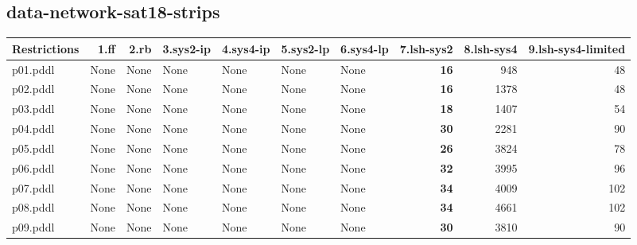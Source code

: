 \documentclass{article}
\begin{document}
\hypertarget{restrictions-data-network-sat18-strips}{}
\subsection*{data-network-sat18-strips}

\begin{tabular}{@{}lrrrrrrrrr@{}}
Restrictions & 1.ff & 2.rb & 3.sys2-ip & 4.sys4-ip & 5.sys2-lp & 6.sys4-lp & 7.lsh-sys2 & 8.lsh-sys4 & 9.lsh-sys4-limited \\
\midrule
p01.pddl & \multicolumn{1}{|l|}{None} & \multicolumn{1}{|l|}{None} & \multicolumn{1}{|l|}{None} & \multicolumn{1}{|l|}{None} & \multicolumn{1}{|l|}{None} & \multicolumn{1}{|l|}{None} & \textbf{16} & 948 & 48 \\
p02.pddl & \multicolumn{1}{|l|}{None} & \multicolumn{1}{|l|}{None} & \multicolumn{1}{|l|}{None} & \multicolumn{1}{|l|}{None} & \multicolumn{1}{|l|}{None} & \multicolumn{1}{|l|}{None} & \textbf{16} & 1378 & 48 \\
p03.pddl & \multicolumn{1}{|l|}{None} & \multicolumn{1}{|l|}{None} & \multicolumn{1}{|l|}{None} & \multicolumn{1}{|l|}{None} & \multicolumn{1}{|l|}{None} & \multicolumn{1}{|l|}{None} & \textbf{18} & 1407 & 54 \\
p04.pddl & \multicolumn{1}{|l|}{None} & \multicolumn{1}{|l|}{None} & \multicolumn{1}{|l|}{None} & \multicolumn{1}{|l|}{None} & \multicolumn{1}{|l|}{None} & \multicolumn{1}{|l|}{None} & \textbf{30} & 2281 & 90 \\
p05.pddl & \multicolumn{1}{|l|}{None} & \multicolumn{1}{|l|}{None} & \multicolumn{1}{|l|}{None} & \multicolumn{1}{|l|}{None} & \multicolumn{1}{|l|}{None} & \multicolumn{1}{|l|}{None} & \textbf{26} & 3824 & 78 \\
p06.pddl & \multicolumn{1}{|l|}{None} & \multicolumn{1}{|l|}{None} & \multicolumn{1}{|l|}{None} & \multicolumn{1}{|l|}{None} & \multicolumn{1}{|l|}{None} & \multicolumn{1}{|l|}{None} & \textbf{32} & 3995 & 96 \\
p07.pddl & \multicolumn{1}{|l|}{None} & \multicolumn{1}{|l|}{None} & \multicolumn{1}{|l|}{None} & \multicolumn{1}{|l|}{None} & \multicolumn{1}{|l|}{None} & \multicolumn{1}{|l|}{None} & \textbf{34} & 4009 & 102 \\
p08.pddl & \multicolumn{1}{|l|}{None} & \multicolumn{1}{|l|}{None} & \multicolumn{1}{|l|}{None} & \multicolumn{1}{|l|}{None} & \multicolumn{1}{|l|}{None} & \multicolumn{1}{|l|}{None} & \textbf{34} & 4661 & 102 \\
p09.pddl & \multicolumn{1}{|l|}{None} & \multicolumn{1}{|l|}{None} & \multicolumn{1}{|l|}{None} & \multicolumn{1}{|l|}{None} & \multicolumn{1}{|l|}{None} & \multicolumn{1}{|l|}{None} & \textbf{30} & 3810 & 90 \\

\end{tabular}
\end{document}
